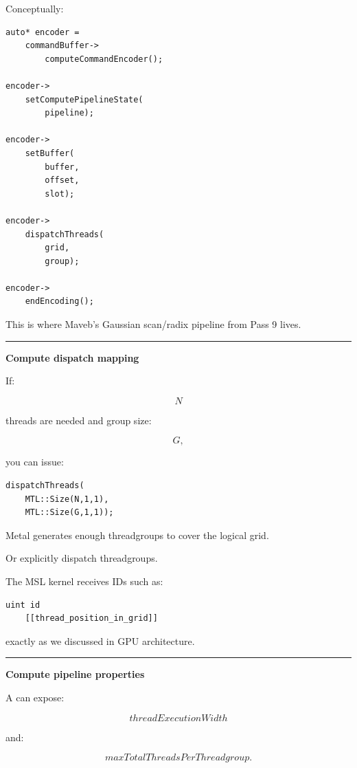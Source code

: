 Conceptually:

\begin{verbatim}
auto* encoder =
    commandBuffer->
        computeCommandEncoder();

encoder->
    setComputePipelineState(
        pipeline);

encoder->
    setBuffer(
        buffer,
        offset,
        slot);

encoder->
    dispatchThreads(
        grid,
        group);

encoder->
    endEncoding();
\end{verbatim}

This is where Maveb's Gaussian scan/radix pipeline from Pass 9 lives.

\begin{center}\rule{0.5\linewidth}{0.5pt}\end{center}

\textbf{Compute dispatch mapping}

If:

\[
N
\]

threads are needed and group size:

\[
G,
\]

you can issue:

\begin{verbatim}
dispatchThreads(
    MTL::Size(N,1,1),
    MTL::Size(G,1,1));
\end{verbatim}

Metal generates enough threadgroups to cover the logical grid.

Or explicitly dispatch threadgroups.

The MSL kernel receives IDs such as:

\begin{verbatim}
uint id
    [[thread_position_in_grid]]
\end{verbatim}

exactly as we discussed in GPU architecture.

\begin{center}\rule{0.5\linewidth}{0.5pt}\end{center}

\textbf{Compute pipeline properties}

A  can expose:

\[
threadExecutionWidth
\]

and:

\[
maxTotalThreadsPerThreadgroup.
\]

